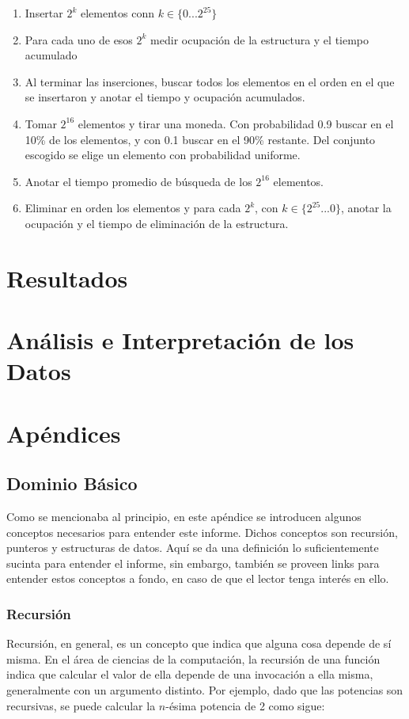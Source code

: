 \documentclass[12pt,letterpaper]{report}
\begin{document}
\begin{enumerate}
\item Insertar $2^k$ elementos conn $k\in \{0 ... 2^{25}\}$
\item Para cada uno de esos $2^k$ medir ocupación de la estructura y el tiempo acumulado
\item Al terminar las inserciones, buscar todos los elementos en el orden en el que se insertaron y anotar el tiempo y ocupación acumulados.
\item Tomar $2^{16}$ elementos y tirar una moneda. Con probabilidad 0.9 buscar en el 10\% de los elementos, y con 0.1 buscar en el 90\% restante. Del conjunto escogido se elige un elemento con probabilidad uniforme.
\item Anotar el tiempo promedio de búsqueda de los $2^{16}$ elementos.
\item Eliminar en orden los elementos y para cada $2^k$, con $k\in \{2^{25} ... 0\}$, anotar la ocupación y el tiempo de eliminación de la estructura.
\end{enumerate}


\section{Resultados}
\section{Análisis e Interpretación de los Datos}
\section{Apéndices}
\subsection{Dominio Básico}
\label{subsec:apen_dombasico}
Como se mencionaba al principio, en este apéndice se introducen algunos conceptos necesarios para entender este informe. Dichos conceptos son recursión, punteros y estructuras de datos. Aquí se da una definición lo suficientemente sucinta para entender el informe, sin embargo, también se proveen links para entender estos conceptos a fondo, en caso de que el lector tenga interés en ello.

\subsubsection{Recursión}

Recursión, en general, es un concepto que indica que alguna cosa depende de sí misma. En el área de ciencias de la computación, la recursión de una función indica que calcular el valor de ella depende de una invocación a ella misma, generalmente con un argumento distinto. Por ejemplo, dado que las potencias son recursivas, se puede calcular la $n$-ésima potencia de 2 como sigue:
\end{document}
